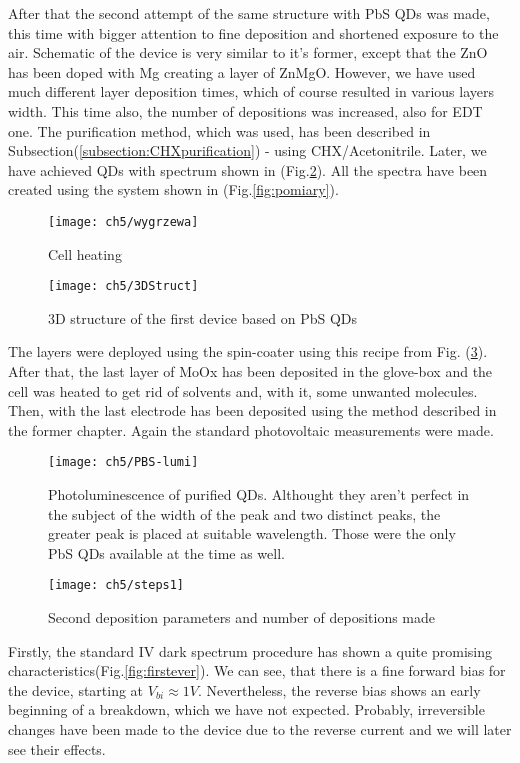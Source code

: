 After that the second attempt of the same structure with PbS QDs was made, this time with bigger attention to fine deposition and shortened exposure to the air. Schematic of the device is very similar to it's former, except that the ZnO has been doped with Mg creating a layer of ZnMgO. However, we have used much different layer deposition times, which of course resulted in various layers width. This time also, the number of depositions was increased, also for EDT one. The purification method, which was used, has been described in Subsection(\ref{subsection:CHXpurification}) - using CHX/Acetonitrile. Later, we have achieved QDs with spectrum shown in (Fig.\ref{fig:PBS}). All the spectra have been created using the system shown in (Fig.\ref{fig:pomiary}).

\begin{figure}[H]
\centering
\texttt{[image: ch5/wygrzewa]}
\caption{Cell heating}
\end{figure}

\begin{figure}
\center
\texttt{[image: ch5/3DStruct]}
\caption{3D structure of the first device based on PbS QDs}
\label{fig:1stStructure}
\end{figure}
The layers were deployed using the spin-coater using this recipe from Fig. (\ref{fig:steps1}). After that, the last layer of MoOx has been deposited in the glove-box and the cell was heated to get rid of solvents and, with it, some unwanted molecules. Then, with the last electrode has been deposited using the method described in the former chapter. Again the standard photovoltaic measurements were made.

\begin{figure}
\centering
\texttt{[image: ch5/PBS-lumi]}
\caption{Photoluminescence of purified QDs. Althought they aren't perfect in the subject of the width of the peak and two distinct peaks, the greater peak is placed at suitable wavelength. Those were the only PbS QDs available at the time as well. }
\label{fig:PBS}
\end{figure}


\begin{figure}[H]
\centering
\texttt{[image: ch5/steps1]}
\caption{Second deposition parameters and number of depositions made}
\label{fig:steps1}
\end{figure}

Firstly, the standard IV dark spectrum procedure has shown a quite promising characteristics(Fig.\ref{fig:firstever}). We can see, that there is a fine forward bias for the device, starting at $V_{bi} \approx 1V$. Nevertheless, the reverse bias shows an early beginning of a breakdown, which we have not expected. Probably, irreversible changes have been made to the device due to the reverse current and we will later see their effects.  

